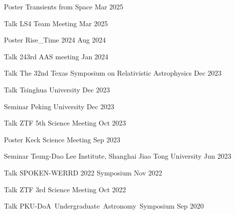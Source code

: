 


\begin{cventries}
	
	\cvsimpentry
	{Poster}
	{Transients from Space}
	{Mar 2025}
	{}

	\cvsimpentry
	{Talk}
	{LS4 Team Meeting}
	{Mar 2025}
	{}

	\cvsimpentry
	{Poster}
	{Rise\_Time 2024}
	{Aug 2024}
	{}

	\cvsimpentry
	{Talk}
	{243rd AAS meeting}
	{Jan 2024}
	{}

	\cvsimpentry
	{Talk}
	{The 32nd Texas Symposium on Relativistic Astrophysics}
	{Dec 2023}
	{}

	\cvsimpentry
	{Talk}
	{Tsinghua University}
	{Dec 2023}
	{}

	\cvsimpentry
	{Seminar}
	{Peking University}
	{Dec 2023}
	{}

	\cvsimpentry
	{Talk}
	{ZTF 5th Science Meeting}
	{Oct 2023}
	{}
	
	\cvsimpentry
	{Poster}
	{Keck Science Meeting}
	{Sep 2023}
	{}

	\cvsimpentry
	{Seminar}
	{Tsung-Dao Lee Institute, Shanghai Jiao Tong University}
	{Jun 2023}
	{}

	\cvsimpentry
	{Talk}
	{SPOKEN-WERRD 2022 Symposium} %
	{Nov 2022} %
	{}

	\cvsimpentry
	{Talk} %
	{ZTF 3rd Science Meeting} %
	{Oct 2022} %
	{}
	
	\cvsimpentry
	{Talk} %
	{PKU-DoA Undergraduate Astronomy Symposium} %
	{Sep 2020} %
	{}

\end{cventries}